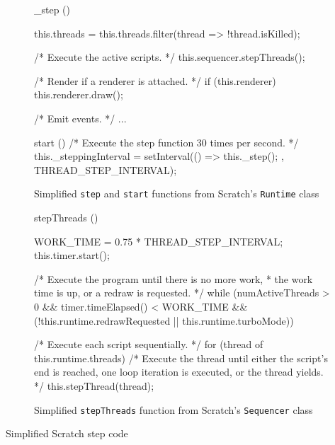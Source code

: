 \begin{listing}[htpb]
    \centering
    \begin{subfigure}{.9\textwidth}
        \begin{javascriptcode}
            _step () {
                this.threads = this.threads.filter(thread => !thread.isKilled);

                /* Execute the active scripts. */
                this.sequencer.stepThreads();

                /* Render if a renderer is attached. */
                if (this.renderer) {
                    this.renderer.draw();
                }

                /* Emit events. */
                ...
            }

            start () {
                /* Execute the step function 30 times per second. */
                this._steppingInterval = setInterval(() => {
                    this._step();
                }, THREAD_STEP_INTERVAL);
            }
        \end{javascriptcode}
        \vspace{-\bigskipamount}
        \caption{Simplified \texttt{step} and \texttt{start} functions from Scratch's \texttt{Runtime} class}
    \end{subfigure}

    \bigskip

    \begin{subfigure}{.9\textwidth}
        \begin{javascriptcode}
            stepThreads () {
                WORK_TIME = 0.75 * THREAD_STEP_INTERVAL;
                this.timer.start();

                /* Execute the program until there is no more work,
                 * the work time is up, or a redraw is requested. */
                while (numActiveThreads > 0 &&
                       timer.timeElapsed() < WORK_TIME &&
                       (!this.runtime.redrawRequested || this.runtime.turboMode)) {

                    /* Execute each script sequentially. */
                    for (thread of this.runtime.threads) {
                        /* Execute the thread until either the script's end
                           is reached, one loop iteration is executed,
                           or the thread yields. */
                        this.stepThread(thread);
                    }
                }
            }
        \end{javascriptcode}
        \vspace{-\bigskipamount}
        \caption{Simplified \texttt{stepThreads} function from Scratch's \texttt{Sequencer} class}
    \end{subfigure}
    \caption{Simplified Scratch step code}
    \label{lst:simplified_scratch_step}
\end{listing}

